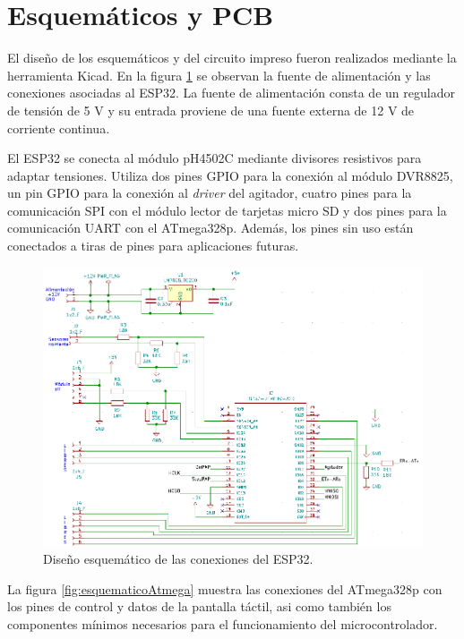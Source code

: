 \section{Esquemáticos y PCB}

El diseño de los esquemáticos y del circuito impreso fueron realizados mediante la herramienta Kicad. En la figura \ref{fig:esquematicoESP} se observan la fuente de alimentación y las conexiones asociadas al ESP32. La fuente de alimentación consta de un regulador de tensión de 5 V y su entrada proviene de una fuente externa de 12 V de corriente continua.

El ESP32 se conecta al módulo pH4502C mediante divisores resistivos para adaptar tensiones. Utiliza dos pines GPIO para la conexión al módulo DVR8825, un pin GPIO para la conexión al \textit{driver} del agitador, cuatro pines para la comunicación SPI con el módulo lector de tarjetas micro SD y dos pines para la comunicación UART con el ATmega328p. Además, los pines sin uso están conectados a tiras de pines para aplicaciones futuras.

\begin{figure}[htbp]
	\centering
	\includegraphics[width=1.0\textwidth]{./Figures/esquematicoESP.png}
	\caption{Diseño esquemático de las conexiones del ESP32.}
	\label{fig:esquematicoESP}
\end{figure}

La figura \ref{fig:esquematicoAtmega} muestra las conexiones del ATmega328p con los pines de control y datos de la pantalla táctil, asi como también los componentes mínimos necesarios para el funcionamiento del microcontrolador.

